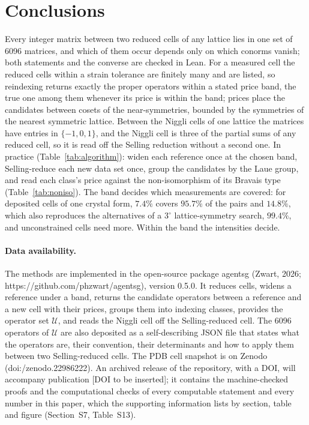 \section{Conclusions}

Every integer matrix between two reduced cells of any lattice lies in one set of 6096 matrices, and which of them occur depends only on which conorms vanish; both statements and the converse are checked in Lean. For a measured cell the reduced cells within a strain tolerance are finitely many and are listed, so reindexing returns exactly the proper operators within a stated price band, the true one among them whenever its price is within the band; prices place the candidates between cosets of the near-symmetries, bounded by the symmetries of the nearest symmetric lattice. Between the Niggli cells of one lattice the matrices have entries in $\{-1,0,1\}$, and the Niggli cell is three of the partial sums of any reduced cell, so it is read off the Selling reduction without a second one. In practice (Table~\ref{tab:algorithm}): widen each reference once at the chosen band, Selling-reduce each new data set once, group the candidates by the Laue group, and read each class's price against the non-isomorphism of its Bravais type (Table~\ref{tab:noniso}). The band decides which measurements are covered: for deposited cells of one crystal form, $7.4\%$ covers $95.7\%$ of the pairs and $14.8\%$, which also reproduces the alternatives of a $3^\circ$ lattice-symmetry search, $99.4\%$, and unconstrained cells need more. Within the band the intensities decide.

\paragraph{Data availability.}\sloppy The methods are implemented in the open-source package agentsg (Zwart, 2026; https://github.com/phzwart/agentsg), version 0.5.0. It reduces cells, widens a reference under a band, returns the candidate operators between a reference and a new cell with their prices, groups them into indexing classes, provides the operator set $\mathcal U$, and reads the Niggli cell off the Selling-reduced cell. The 6096 operators of $\mathcal U$ are also deposited as a self-describing JSON file that states what the operators are, their convention, their determinants and how to apply them between two Selling-reduced cells. The PDB cell snapshot is on Zenodo (doi:/\allowbreak zenodo.22986222). An archived release of the repository, with a DOI, will accompany publication [DOI to be inserted]; it contains the machine-checked proofs and the computational checks of every computable statement and every number in this paper, which the supporting information lists by section, table and figure (Section~S7, Table~S13).\par\fussy

